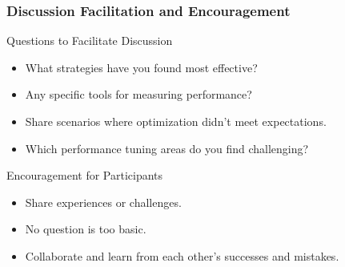 \documentclass[aspectratio=169]{beamer}
\begin{document}
\begin{frame}[fragile]
    \frametitle{Discussion Facilitation and Encouragement}
    \begin{block}{Questions to Facilitate Discussion}
        \begin{itemize}
            \item What strategies have you found most effective?
            \item Any specific tools for measuring performance?
            \item Share scenarios where optimization didn't meet expectations.
            \item Which performance tuning areas do you find challenging?
        \end{itemize}
    \end{block}
    
    \begin{block}{Encouragement for Participants}
        \begin{itemize}
            \item Share experiences or challenges.
            \item No question is too basic.
            \item Collaborate and learn from each other's successes and mistakes.
        \end{itemize}
    \end{block}
\end{frame}
\end{document}
